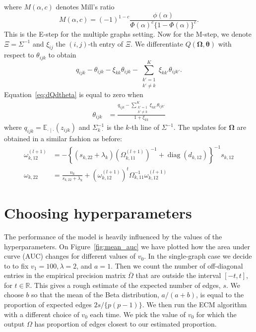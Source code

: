 \documentclass[a4paper, 11pt, oneside]{report}
\DeclareMathOperator{\diag}{diag}
\newcommand{\R}{\mathbb{R}}
\newcommand{\E}{\mathbb{E}}
\newcommand{\1}{\mathds{1}}
\newcommand{\inv}{^{-1}}
\newcommand{\bOmega}{\mathbf{\Omega}}
\newcommand{\btheta}{\mathbf{\theta}}
\begin{document}
where $M(\alpha, c)$ denotes Mill's ratio
\[
	M(\alpha, c) = (-1)^{1-c}\frac{\phi(\alpha)}{\Phi(\alpha)^c \{1 - \Phi(\alpha)\}^c}.
\]
This is the E-step for the multiple graphs setting.
Now for the M-step, we denote $\Xi = \Sigma\inv$ and $\xi_{ij}$ the $(i, j)$-th entry of $\Xi$.
We differentiate $Q(\bOmega, \btheta)$ with respect to
$\theta_{ijk}$ to obtain
\begin{equation}\label{eq:dQdtheta}
	q_{ijk} - \theta_{ijk}  - \xi_{kk} \theta_{ijk} - \sum_{\substack
		{k' = 1 \\ k' \neq k}}^K \xi_{k k'} \theta_{ijk'}.
\end{equation}
Equation~\eqref{eq:dQdtheta} is equal to
zero when
\begin{align*}
	\theta_{ijk} & = \frac{q_{ijk} - \sum_{\substack{k'=1 \\ k' \neq k}}^K \xi_{k k'}\theta_{ijk'}}{ 1 + \xi_{kk}}
\end{align*}
where $q_{ijk} = \E_{\cdot \mid \cdot}(z_{ijk})$ and $\Sigma_{k \, \cdot}\inv$ is
the $k$-th line of $\Sigma\inv$.
The updates for $\bOmega$ are obtained in a similar fashion as before:
\begin{align*}
	\omega_{k,12}^{(l+1)} & = -\left\{(s_{k, 22} + \lambda_k) \left(\Omega_{k, 11}^{(l+1)}\right)\inv + \diag(d_{k, 12})\right\}\inv s_{k, 12}  \\
	\omega_{k, 22}        & = \frac{n_k}{s_{k,22} + \lambda_k} + \left(\omega_{k,12}^{(l+1)}\right)^t \Omega_{k, 11}\inv \omega_{k, 12}^{(l+1)}
\end{align*}

\chapter{Choosing hyperparameters}
The performance of the model is heavily influenced by the values of the
hyperparameters. On Figure~\ref{fig:mean_auc} we have plotted how the area
under curve (AUC) changes for different values of $v_0$. In the single-graph
case we decide to to fix $v_1 = 100,
	\lambda = 2$, and $a = 1$. Then we count the number of off-diagonal entries in
the empirical precision matrix $\bar \Omega$ that are outside the interval
$[-t, t]$, for $t \in \R$. This gives a rough estimate of the expected number
of edges, $s$. We choose $b$ so that the mean of the Beta distribution,
$a/(a+b)$, is equal to the proportion of expected edges $2s/\{p(p-1)\}$. We then
run the ECM algorithm with a different choice of $v_0$ each time. We pick the
value of $v_0$ for which the output $\Omega$ has proportion of edges closest to
our estimated proportion.
\end{document}
